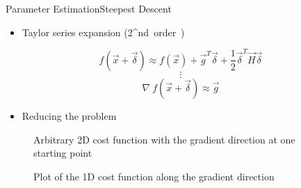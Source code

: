 \begin{frame}{Parameter Estimation}{Steepest Descent}
  \begin{itemize}
    \item Taylor series expansion (2\si{^{nd}} order)
  \end{itemize}
  \begin{displaymath}
    \si{f(\vec{x}+\vec{\delta}) \approx f(\vec{x}) + \vec{g}^T \vec{\delta} + \frac{1}{2} \vec{\delta}^T \vec{H}\vec{\delta}}
  \end{displaymath}
  \begin{displaymath}
    \vdots
  \end{displaymath}
  \begin{displaymath}
    \si{\nabla\ f(\vec{x}+\vec{\delta}) \approx \vec{g}}
  \end{displaymath}
  \vspace{-12pt}
  \pause
  \begin{itemize}
    \item Reducing the problem
  \end{itemize}
    \begin{minipage}{\linewidth}
    \begin{minipage}{0.35\linewidth}
      \begin{figure}[H]
        \centering
        Arbitrary 2D cost function with the gradient direction at one starting point
      \end{figure}
    \end{minipage}
    \hspace{0.03\linewidth}
    \begin{minipage}{0.45\linewidth}
      \begin{figure}[H]
        \centering
        Plot of the 1D cost function along the gradient direction
      \end{figure}
    \end{minipage}
  \end{minipage}
\end{frame}


